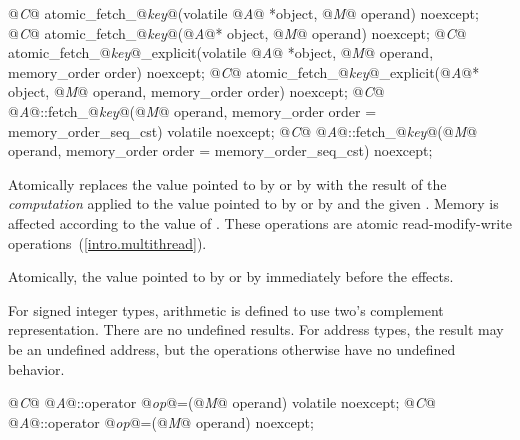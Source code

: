 %
%
%
%
\begin{itemdecl}
@\textit{C}@ atomic_fetch_@\textit{key}@(volatile @\textit{A}@ *object, @\textit{M}@ operand) noexcept;
@\textit{C}@ atomic_fetch_@\textit{key}@(@\textit{A}@* object, @\textit{M}@ operand) noexcept;
@\textit{C}@ atomic_fetch_@\textit{key}@_explicit(volatile @\textit{A}@ *object, @\textit{M}@ operand, memory_order order) noexcept;
@\textit{C}@ atomic_fetch_@\textit{key}@_explicit(@\textit{A}@* object, @\textit{M}@ operand, memory_order order) noexcept;
@\textit{C}@ @\textit{A}@::fetch_@\textit{key}@(@\textit{M}@ operand, memory_order order = memory_order_seq_cst) volatile noexcept;
@\textit{C}@ @\textit{A}@::fetch_@\textit{key}@(@\textit{M}@ operand, memory_order order = memory_order_seq_cst) noexcept;
\end{itemdecl}

\begin{itemdescr}
\pnum
\effects Atomically replaces the value pointed to by  or by
 with the result of the \textit{computation} applied to the
value pointed to by  or by  and the given .
Memory is affected according to the value of .
These operations are atomic read-modify-write operations~(\ref{intro.multithread}).

\pnum
\returns Atomically, the value pointed to by  or by  immediately before the effects.

\pnum
\note For signed integer types, arithmetic is defined to use two's complement
representation. There are no undefined results. For address types, the result may be an
undefined address, but the operations otherwise have no undefined behavior.
\end{itemdescr}

%
%
\begin{itemdecl}
@\textit{C}@ @\textit{A}@::operator @\textit{op}@=(@\textit{M}@ operand) volatile noexcept;
@\textit{C}@ @\textit{A}@::operator @\textit{op}@=(@\textit{M}@ operand) noexcept;
\end{itemdecl}

\begin{itemdescr}
\pnum
\effects {}

\pnum
\returns {}
\end{itemdescr}


